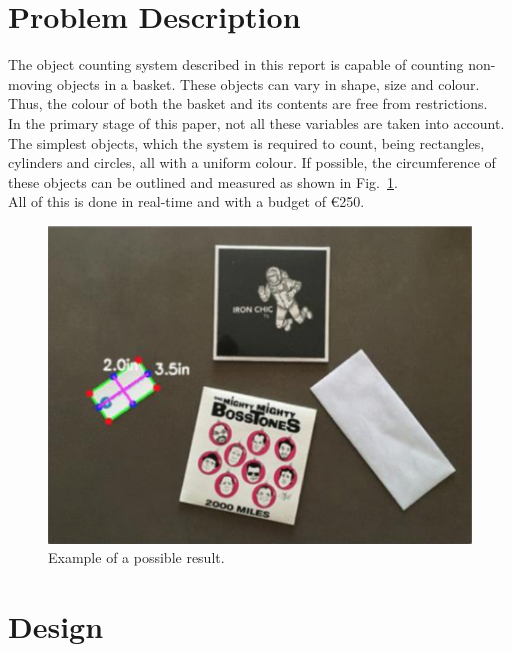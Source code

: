 \documentclass{article}
\begin{document}
\section{Problem Description}
The object counting system described in this report is capable of counting non-moving objects in a basket. These objects can vary in shape, size and colour. Thus, the colour of both the basket and its contents are free from restrictions.\\
In the primary stage of this paper, not all these variables are taken into account. The simplest objects, which the system is required to count, being rectangles, cylinders and circles, all with a uniform colour. If possible, the circumference of these objects can be outlined and measured as shown in Fig.~\ref{fig:example}.\\ All of this is done in real-time and with a budget of \euro 250.
\begin{figure}[h]
\centering
\includegraphics[width=0.7\linewidth]{opdracht.png}
\caption{Example of a possible result.}
\label{fig:example}
\end{figure}

\section{Design}
\end{document}
